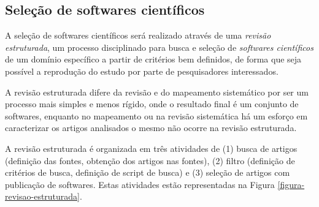 % 
%
%

\subsection{Seleção de softwares científicos}

A seleção de softwares científicos será realizado através de uma {\it revisão
estruturada}, um processo disciplinado para busca e seleção de {\it softwares
científicos} de um domínio específico a partir de critérios bem definidos, de
forma que seja possível a reprodução do estudo por parte de pesquisadores
interessados.

A revisão estruturada difere da revisão e do mapeamento sistemático por ser um
processo mais simples e menos rígido, onde o resultado final é um conjunto de
softwares, enquanto no mapeamento ou na revisão sistemática há um esforço em
caracterizar os artigos analisados o mesmo não ocorre na revisão estruturada.

A revisão estruturada é organizada em três atividades de (1) busca de artigos
(definição das fontes, obtenção dos artigos nas fontes), (2) filtro (definição
de critérios de busca, definição de script de busca) e (3) seleção de artigos
com publicação de softwares. Estas atividades estão representadas na Figura
\ref{figura-revisao-estruturada}.

